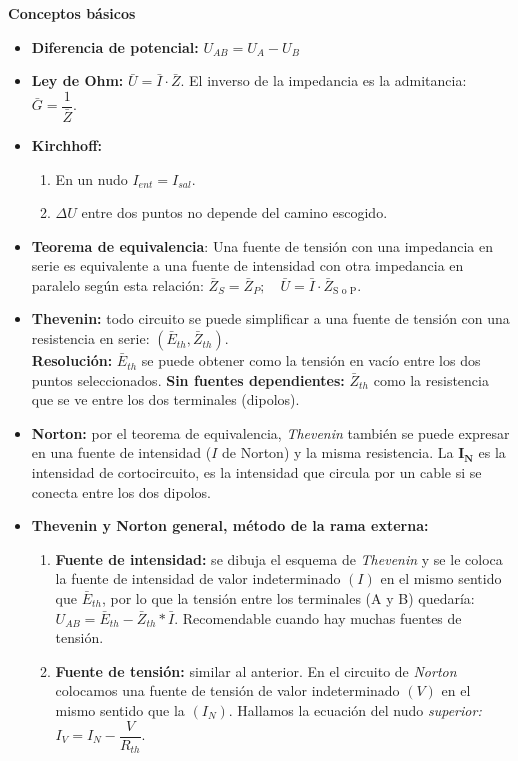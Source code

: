\documentclass[a4paper, twocolumn, 10pt]{article}
\begin{document}
\Large\textbf{Conceptos básicos} \normalsize

\begin{itemize}
	\item \textbf{Diferencia de potencial:} $U_{AB} = U_A - U_B$
	\item \textbf{Ley de Ohm:} $\bar{U} = \bar{I} \cdot \bar{Z}$. El inverso de la impedancia es la admitancia: $\bar{G} = \dfrac{1}{\bar{Z}}$.
	\item \textbf{Kirchhoff:}
	\begin{enumerate}
		\item En un nudo $I_{ent} = I_{sal}$.
		\item  $\Delta U$ entre dos puntos no depende del camino escogido.
	\end{enumerate}
	\item \textbf{Teorema de equivalencia}: Una fuente de tensión con una impedancia en serie es equivalente a una fuente de intensidad con otra impedancia en paralelo según esta relación: $\bar{Z}_S = \bar{Z}_P; \quad \bar{U} = \bar{I} \cdot \bar{Z}_\text{S o P}$.
	\item \textbf{Thevenin:} todo circuito se puede simplificar a una fuente de tensión con una resistencia en serie: $(\bar{E}_{th}, \bar{Z}_{th})$. \\
	\textbf{Resolución:} $\bar{E}_{th}$ se puede obtener como la tensión en vacío entre los dos puntos seleccionados. \textbf{Sin fuentes dependientes:} $\bar{Z}_{th}$ como la resistencia que se ve entre los dos terminales (dipolos).
	\item \textbf{Norton:} por el teorema de equivalencia, \textit{Thevenin} también se puede expresar en una fuente de intensidad ($I$ de Norton) y la misma resistencia. La $\mathbf{I_{N}}$ es la intensidad de cortocircuito, es la intensidad que circula por un cable si se conecta entre los dos dipolos.
	\item \textbf{Thevenin y Norton general, método de la rama externa:} 
	\begin{enumerate}
		\item \textbf{Fuente de intensidad:} se dibuja el esquema de \textit{Thevenin} y se le coloca la fuente de intensidad de valor indeterminado $(I)$ en el mismo sentido que $\bar{E}_{th}$, por lo que la tensión entre los terminales (A y B) quedaría: $U_{AB} = \bar{E}_{th} - \bar{Z}_{th} * \bar{I}$. Recomendable cuando hay muchas fuentes de tensión.
		\item \textbf{Fuente de tensión:} similar al anterior. En el circuito de \textit{Norton} colocamos una fuente de tensión de valor indeterminado $(V)$ en el mismo sentido que la $(I_N)$. Hallamos la ecuación del nudo \textit{superior:} $ I_V =I_N - \dfrac{V}{R_{th}}$.
	\end{enumerate}
	

\end{itemize}
\end{document}

